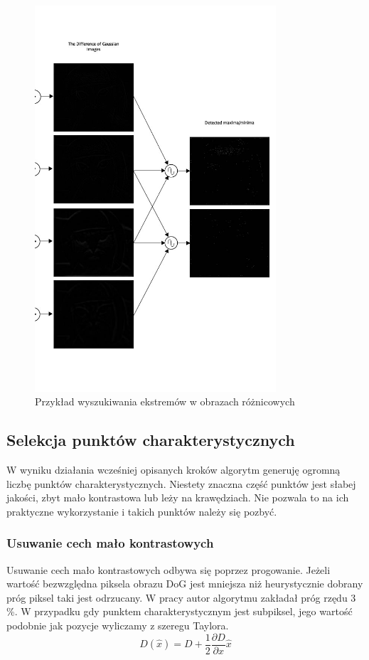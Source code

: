 \begin{figure}[!htb]
\centering
\includegraphics[width=0.8\textwidth]{pict/02/sift/sift_ais_extremum.jpg}
\caption{Przykład wyszukiwania ekstremów w obrazach różnicowych}
\label{fig:sift_ais_extremum}
\end{figure}




\subsection{Selekcja punktów charakterystycznych}
W wyniku działania wcześniej opisanych kroków algorytm generuję ogromną liczbę punktów charakterystycznych. Niestety znaczna część punktów jest słabej jakości, zbyt mało kontrastowa lub leży na krawędziach. Nie pozwala to na ich praktyczne wykorzystanie i takich punktów należy się pozbyć.
\subsubsection{Usuwanie cech mało kontrastowych}
Usuwanie cech mało kontrastowych odbywa się poprzez progowanie. Jeżeli wartość bezwzględna piksela obrazu DoG jest mniejsza niż heurystycznie dobrany próg piksel taki jest odrzucany. W pracy \cite{DGL04} autor algorytmu zakładał próg rzędu 3 \%. W przypadku gdy punktem charakterystycznym jest subpiksel, jego wartość podobnie jak pozycje wyliczamy z szeregu Taylora.
\begin{equation}
D(\widehat{x}) = D +   \frac{1}{2}\frac{\partial D}{\partial x}\widehat{x}
\end{equation}
